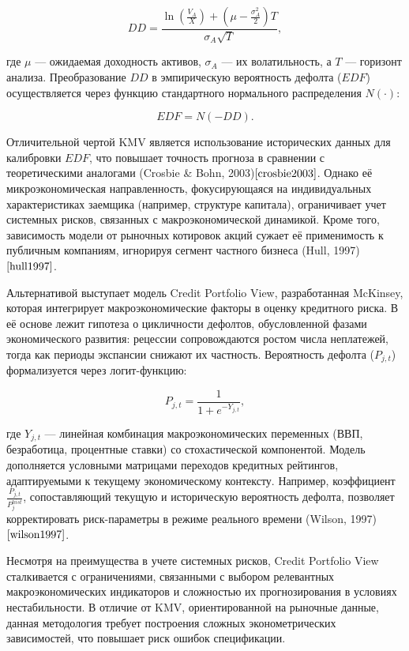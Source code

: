 \documentclass[]{article}
\begin{document}
	\[
	DD = \frac{\ln\left(\frac{V_A}{X}\right) + \left(\mu - \frac{\sigma_A^2}{2}\right)T}{\sigma_A \sqrt{T}},
	\]  
	
	где \(\mu\) — ожидаемая доходность активов, \(\sigma_A\) — их волатильность, а \(T\) — горизонт анализа. Преобразование \(DD\) в эмпирическую вероятность дефолта (\(EDF\)) осуществляется через функцию стандартного нормального распределения \(N(\cdot)\):  
	
	\[
	EDF = N(-DD).
	\]  
	
	Отличительной чертой KMV является использование исторических данных для калибровки \(EDF\), что повышает точность прогноза в сравнении с теоретическими аналогами (Crosbie \& Bohn, 2003)$\cite{crosbie2003}$. Однако её микроэкономическая направленность, фокусирующаяся на индивидуальных характеристиках заемщика (например, структуре капитала), ограничивает учет системных рисков, связанных с макроэкономической динамикой. Кроме того, зависимость модели от рыночных котировок акций сужает её применимость к публичным компаниям, игнорируя сегмент частного бизнеса (Hull, 1997)$\cite{hull1997}$.  
	
	Альтернативой выступает модель Credit Portfolio View, разработанная McKinsey, которая интегрирует макроэкономические факторы в оценку кредитного риска. В её основе лежит гипотеза о цикличности дефолтов, обусловленной фазами экономического развития: рецессии сопровождаются ростом числа неплатежей, тогда как периоды экспансии снижают их частность. Вероятность дефолта (\(P_{j,t}\)) формализуется через логит-функцию:  
	
	\[
	P_{j,t} = \frac{1}{1 + e^{-Y_{j,t}}},
	\]  
	
	где \(Y_{j,t}\) — линейная комбинация макроэкономических переменных (ВВП, безработица, процентные ставки) со стохастической компонентой. Модель дополняется условными матрицами переходов кредитных рейтингов, адаптируемыми к текущему экономическому контексту. Например, коэффициент \(\frac{P_{j,t}}{P_{j}^{hist}}\), сопоставляющий текущую и историческую вероятность дефолта, позволяет корректировать риск-параметры в режиме реального времени (Wilson, 1997)$\cite{wilson1997}$.  
	
	Несмотря на преимущества в учете системных рисков, Credit Portfolio View сталкивается с ограничениями, связанными с выбором релевантных макроэкономических индикаторов и сложностью их прогнозирования в условиях нестабильности. В отличие от KMV, ориентированной на рыночные данные, данная методология требует построения сложных эконометрических зависимостей, что повышает риск ошибок спецификации.  
	
\end{document}
